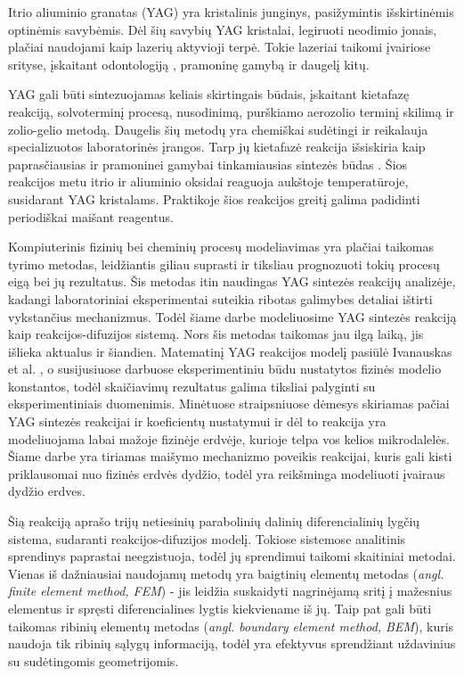 
Itrio aliuminio granatas (YAG) yra kristalinis junginys, pasižymintis išskirtinėmis optinėmis savybėmis. Dėl šių savybių YAG kristalai, legiruoti neodimio jonais, plačiai naudojami kaip lazerių aktyvioji terpė. Tokie lazeriai taikomi įvairiose srityse, įskaitant odontologiją \cite{valentiUseErYAG2021}, pramoninę gamybą \cite{dubeyExperimentalStudyNd2008} ir daugelį kitų.

YAG gali būti sintezuojamas keliais skirtingais būdais, įskaitant kietafazę reakciją, solvoterminį procesą, nusodinimą, purškiamo aerozolio terminį skilimą ir zolio-gelio metodą. Daugelis šių metodų yra chemiškai sudėtingi ir reikalauja specializuotos laboratorinės įrangos. Tarp jų kietafazė reakcija išsiskiria kaip paprasčiausias ir pramoninei gamybai tinkamiausias sintezės būdas \cite{zhangNovelSynthesisYAG2005}. Šios reakcijos metu itrio ir aliuminio oksidai reaguoja aukštoje temperatūroje, susidarant YAG kristalams. Praktikoje šios reakcijos greitį galima padidinti periodiškai maišant reagentus.

Kompiuterinis fizinių bei cheminių procesų modeliavimas yra plačiai taikomas tyrimo metodas, leidžiantis giliau suprasti ir tiksliau prognozuoti tokių procesų eigą bei jų rezultatus. Šis metodas itin naudingas YAG sintezės reakcijų analizėje, kadangi laboratoriniai eksperimentai suteikia ribotas galimybes detaliai ištirti vykstančius mechanizmus. Todėl šiame darbe modeliuosime YAG sintezės reakciją kaip reakcijos-difuzijos sistemą. Nors šis metodas taikomas jau ilgą laiką, jis išlieka aktualus ir šiandien. Matematinį YAG reakcijos modelį pasiūlė Ivanauskas et al. \cite{ivanauskasModellingSolidState2005}, o susijusiuose darbuose \cite{ivanauskasComputationalModellingYAG2009,mackeviciusCloserLookComputer2012} eksperimentiniu būdu nustatytos fizinės modelio konstantos, todėl skaičiavimų rezultatus galima tiksliai palyginti su eksperimentiniais duomenimis. Minėtuose straipsniuose dėmesys skiriamas pačiai YAG sintezės reakcijai ir koeficientų nustatymui ir dėl to reakcija yra modeliuojama labai mažoje fizinėje erdvėje, kurioje telpa vos kelios mikrodalelės. Šiame darbe yra tiriamas maišymo mechanizmo poveikis reakcijai, kuris gali kisti priklausomai nuo fizinės erdvės dydžio, todėl yra reikšminga modeliuoti įvairaus dydžio erdves.

Šią reakciją aprašo trijų netiesinių parabolinių dalinių diferencialinių lygčių sistema, sudaranti reakcijos-difuzijos modelį. Tokiose sistemose analitinis sprendinys paprastai neegzistuoja, todėl jų sprendimui taikomi skaitiniai metodai. Vienas iš dažniausiai naudojamų metodų yra baigtinių elementų metodas (\textit{angl. finite element method, FEM}) - jis leidžia suskaidyti nagrinėjamą sritį į mažesnius elementus ir spręsti diferencialines lygtis kiekviename iš jų. Taip pat gali būti taikomas ribinių elementų metodas (\textit{angl. boundary element method, BEM}), kuris naudoja tik ribinių sąlygų informaciją, todėl yra efektyvus sprendžiant uždavinius su sudėtingomis geometrijomis.


